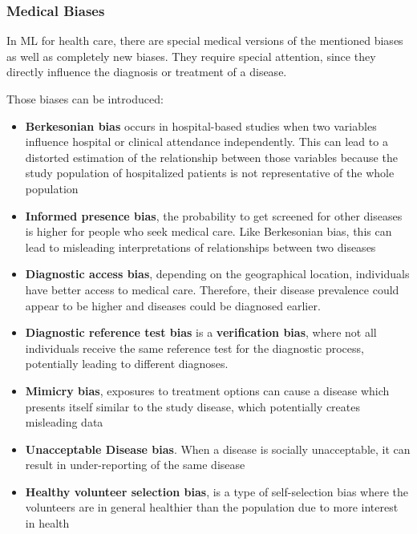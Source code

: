 \documentclass[12pt, a4paper, oneside]{book}   	%
\renewcommand{\paragraph}[1]{%
	\subsubsection*{#1}%
}
\begin{document}
			\paragraph{Medical Biases}
			In ML for health care, there are special medical versions of the mentioned biases as well as completely new biases. They require special attention, since they directly influence the diagnosis or treatment of a disease.
			
			Those biases can be introduced:
			\begin{itemize}
				\item \textbf{Berkesonian bias} occurs in hospital-based studies when two variables influence hospital or clinical attendance independently. This can lead to a distorted estimation of the relationship between those variables because the study population of hospitalized patients is not representative of the whole population \autocite{Chakraborty_2024, c3, c7}
				\item \textbf{Informed presence bias}, the probability to get screened for other diseases is higher for people who seek medical care. Like Berkesonian bias, this can lead to misleading interpretations of relationships between two diseases \autocite{Chakraborty_2024, c27, c23}
				\item \textbf{Diagnostic access bias}, depending on the geographical location, individuals have better access to medical care. Therefore, their disease prevalence could appear to be higher and diseases could be diagnosed earlier. \autocite{Chakraborty_2024, c19-c21}
				\item \textbf{Diagnostic reference test bias} is a \textbf{verification bias}, where not all individuals receive the same reference test for the diagnostic process, potentially leading to different diagnoses. \autocite{Chakraborty_2024, c21}
				\item \textbf{Mimicry bias}, exposures to treatment options can cause a disease which presents itself similar to the study disease, which potentially creates misleading data \autocite{Chakraborty_2024, c28, c25}
				\item \textbf{Unacceptable Disease bias}. When a disease is socially unacceptable, it can result in under-reporting of the same disease \autocite{Chakraborty_2024, c30, c27}
				\item \textbf{Healthy volunteer selection bias}, is a type of self-selection bias where the volunteers are in general healthier than the population due to more interest in health \autocite{Delgado-Rodriguez_2004}
			\end{itemize}
			
\end{document}
